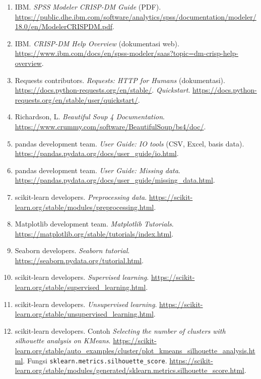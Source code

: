 \documentclass[12pt,a4paper]{article}
\begin{document}
\begin{enumerate}[leftmargin=*]
  \item IBM. \textit{SPSS Modeler CRISP-DM Guide} (PDF). \url{https://public.dhe.ibm.com/software/analytics/spss/documentation/modeler/18.0/en/ModelerCRISPDM.pdf}.

  \item IBM. \textit{CRISP-DM Help Overview} (dokumentasi web). \url{https://www.ibm.com/docs/en/spss-modeler/saas?topic=dm-crisp-help-overview}.

  \item Requests contributors. \textit{Requests: HTTP for Humans} (dokumentasi). \url{https://docs.python-requests.org/en/stable/}. \textit{Quickstart}. \url{https://docs.python-requests.org/en/stable/user/quickstart/}.

  \item Richardson, L. \textit{Beautiful Soup 4 Documentation}. \url{https://www.crummy.com/software/BeautifulSoup/bs4/doc/}.

  \item pandas development team. \textit{User Guide: IO tools} (CSV, Excel, basis data). \url{https://pandas.pydata.org/docs/user_guide/io.html}.

  \item pandas development team. \textit{User Guide: Missing data}. \url{https://pandas.pydata.org/docs/user_guide/missing_data.html}.

  \item scikit-learn developers. \textit{Preprocessing data}. \url{https://scikit-learn.org/stable/modules/preprocessing.html}.

  \item Matplotlib development team. \textit{Matplotlib Tutorials}. \url{https://matplotlib.org/stable/tutorials/index.html}.

  \item Seaborn developers. \textit{Seaborn tutorial}. \url{https://seaborn.pydata.org/tutorial.html}.

  \item scikit-learn developers. \textit{Supervised learning}. \url{https://scikit-learn.org/stable/supervised_learning.html}.

  \item scikit-learn developers. \textit{Unsupervised learning}. \url{https://scikit-learn.org/stable/unsupervised_learning.html}.

  \item scikit-learn developers. Contoh \textit{Selecting the number of clusters with silhouette analysis on KMeans}. \url{https://scikit-learn.org/stable/auto_examples/cluster/plot_kmeans_silhouette_analysis.html}. Fungsi \texttt{sklearn.metrics.silhouette\_score}. \url{https://scikit-learn.org/stable/modules/generated/sklearn.metrics.silhouette_score.html}.


\end{enumerate}
\end{document}
